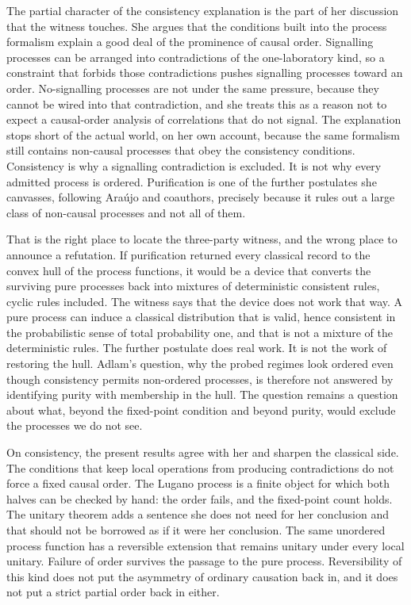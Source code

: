 \documentclass[11pt]{article}
\begin{document}
The partial character of the consistency explanation is the part of her discussion that the witness touches. She argues that the conditions built into the process formalism explain a good deal of the prominence of causal order. Signalling processes can be arranged into contradictions of the one-laboratory kind, so a constraint that forbids those contradictions pushes signalling processes toward an order. No-signalling processes are not under the same pressure, because they cannot be wired into that contradiction, and she treats this as a reason not to expect a causal-order analysis of correlations that do not signal. The explanation stops short of the actual world, on her own account, because the same formalism still contains non-causal processes that obey the consistency conditions. Consistency is why a signalling contradiction is excluded. It is not why every admitted process is ordered. Purification is one of the further postulates she canvasses, following Ara\'ujo and coauthors, precisely because it rules out a large class of non-causal processes and not all of them.

That is the right place to locate the three-party witness, and the wrong place to announce a refutation. If purification returned every classical record to the convex hull of the process functions, it would be a device that converts the surviving pure processes back into mixtures of deterministic consistent rules, cyclic rules included. The witness says that the device does not work that way. A pure process can induce a classical distribution that is valid, hence consistent in the probabilistic sense of total probability one, and that is not a mixture of the deterministic rules. The further postulate does real work. It is not the work of restoring the hull. Adlam's question, why the probed regimes look ordered even though consistency permits non-ordered processes, is therefore not answered by identifying purity with membership in the hull. The question remains a question about what, beyond the fixed-point condition and beyond purity, would exclude the processes we do not see.

On consistency, the present results agree with her and sharpen the classical side. The conditions that keep local operations from producing contradictions do not force a fixed causal order. The Lugano process is a finite object for which both halves can be checked by hand: the order fails, and the fixed-point count holds. The unitary theorem adds a sentence she does not need for her conclusion and that should not be borrowed as if it were her conclusion. The same unordered process function has a reversible extension that remains unitary under every local unitary. Failure of order survives the passage to the pure process. Reversibility of this kind does not put the asymmetry of ordinary causation back in, and it does not put a strict partial order back in either.
\end{document}

